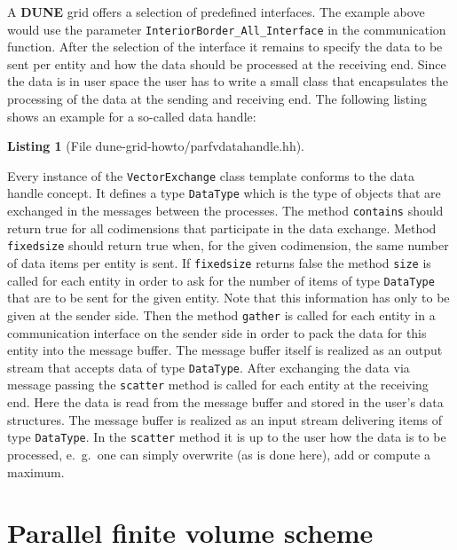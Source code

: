 \documentclass[11pt,a4paper,headinclude,footinclude,DIV16,normalheadings]{scrreprt}
\newcommand{\Dune}{{\sf\bfseries DUNE}}
\newtheorem{lst}{Listing}
\begin{document}
A \Dune{} grid offers a selection of predefined interfaces. The example
above would use the parameter \lstinline!InteriorBorder_All_Interface!
in the communication function. After the
selection of the interface it remains to specify the data to be sent
per entity and how the data should be processed at the receiving
end. Since the data is in user space the user has to write a small
class that encapsulates the processing of the data at the sending and
receiving end. The following listing shows an example for a so-called
data handle:


\begin{lst}[File dune-grid-howto/parfvdatahandle.hh] \mbox{}
\nopagebreak

\end{lst}

Every instance of the \lstinline!VectorExchange! class template
conforms to the data handle concept. It defines a type
\lstinline!DataType! which is the type of objects that are exchanged
in the messages between the processes. The method \lstinline!contains!
should return true for all codimensions that participate in the data
exchange. Method \lstinline!fixedsize! should return true when, for
the given codimension, the same number of data items per entity is
sent. If \lstinline!fixedsize! returns false the method
\lstinline!size! is called for each entity in order to ask 
for the number of items of type \lstinline!DataType! that are to be
sent for the given entity. Note that this information has only to be
given at the sender side. Then the method \lstinline!gather! is called
for each entity in a communication interface on the sender side in
order to pack the data for this entity into the message buffer. The
message buffer itself is realized as an output stream that accepts data
of type \lstinline!DataType!. After exchanging the data via message
passing the \lstinline!scatter! method is called for each entity at
the receiving end. Here the data is read from the message buffer and
stored in the user's data structures. The message buffer is realized
as an input stream delivering items of type \lstinline!DataType!. In
the \lstinline!scatter! method it is up to the user how the data is to
be processed, e.~g.~one can simply overwrite (as is done here), add or
compute a maximum.

\section{Parallel finite volume scheme}
\end{document}
